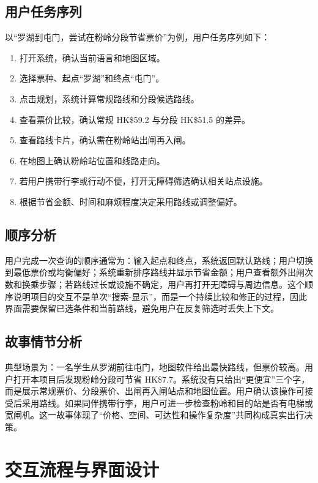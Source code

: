 \documentclass[UTF8,a4paper,11pt]{ctexart}
\begin{document}
\subsection{用户任务序列}

以“罗湖到屯门，尝试在粉岭分段节省票价”为例，用户任务序列如下：
\begin{enumerate}
  \item 打开系统，确认当前语言和地图区域。
  \item 选择票种、起点“罗湖”和终点“屯门”。
  \item 点击规划，系统计算常规路线和分段候选路线。
  \item 查看票价比较，确认常规 HK\$59.2 与分段 HK\$51.5 的差异。
  \item 查看路线卡片，确认需在粉岭站出闸再入闸。
  \item 在地图上确认粉岭站位置和线路走向。
  \item 若用户携带行李或行动不便，打开无障碍筛选确认相关站点设施。
  \item 根据节省金额、时间和麻烦程度决定采用路线或调整偏好。
\end{enumerate}

\subsection{顺序分析}

用户完成一次查询的顺序通常为：输入起点和终点，系统返回默认路线；用户切换到最低票价或均衡偏好；系统重新排序路线并显示节省金额；用户查看额外出闸次数和换乘步骤；若路线过长或设施不确定，用户再打开无障碍与周边信息。这个顺序说明项目的交互不是单次“搜索-显示”，而是一个持续比较和修正的过程，因此界面需要保留已选条件和当前路线，避免用户在反复筛选时丢失上下文。

\subsection{故事情节分析}

典型场景为：一名学生从罗湖前往屯门，地图软件给出最快路线，但票价较高。用户打开本项目后发现粉岭分段可节省 HK\$7.7。系统没有只给出“更便宜”三个字，而是展示常规票价、分段票价、出闸再入闸站点和地图位置。用户确认该操作可接受后采用路线。如果同伴携带行李，用户可进一步检查粉岭和目的站是否有电梯或宽闸机。这一故事体现了“价格、空间、可达性和操作复杂度”共同构成真实出行决策。

\section{交互流程与界面设计}
\end{document}
